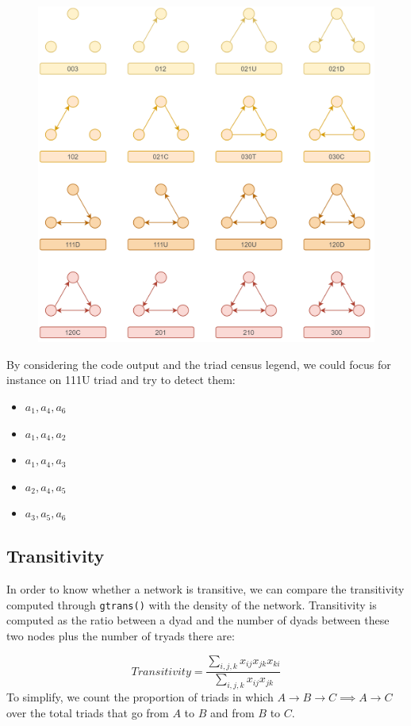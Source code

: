 \documentclass[
  notitlepage,
  onecolumn,
  openany]{book}
\providecommand{\tightlist}{%
  \setlength{\itemsep}{0pt}\setlength{\parskip}{0pt}}
\begin{document}
\begin{figure}[h!]

{\centering \includegraphics[width=0.5\linewidth]{images/12-Reciprocity and transitivity/MAN} 

}

\end{figure}

By considering the code output and the triad census legend, we could focus for instance on 111U triad and try to detect them:

\begin{itemize}
\tightlist
\item
  \(a_1, a_4, a_6\)
\item
  \(a_1, a_4, a_2\)
\item
  \(a_1, a_4, a_3\)
\item
  \(a_2, a_4, a_5\)
\item
  \(a_3, a_5, a_6\)
\end{itemize}

\hypertarget{transitivity}{%
\subsection{Transitivity}\label{transitivity}}

In order to know whether a network is transitive, we can compare the transitivity computed through \texttt{gtrans()} with the density of the network. Transitivity is computed as the ratio between a dyad and the number of dyads between these two nodes plus the number of tryads there are:

\[
Transitivity = \frac{\sum_{i,j,k}x_{ij}x_{jk}x_{ki}}{\sum_{i,j,k}x_{ij}x_{jk}}
\] To simplify, we count the proportion of triads in which \(A \rightarrow B \rightarrow C \implies A\rightarrow C\) over the total triads that go from \(A\) to \(B\) and from \(B\) to \(C\).
\end{document}
